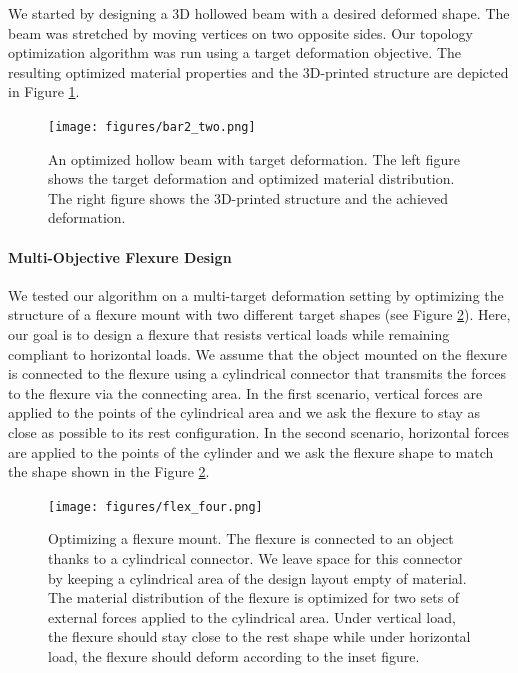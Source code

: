 		We started by designing a 3D hollowed beam with a desired deformed shape. The beam was stretched by moving vertices on two opposite sides. Our topology optimization algorithm was run using a target deformation objective. The resulting optimized material properties and the 3D-printed structure are depicted in Figure \ref{fig:beam}. 
		
		\begin{figure}[h!]
			\centering
			\texttt{[image: figures/bar2\_two.png]}
			\caption{
				An optimized hollow beam with target deformation. The left figure shows the target deformation and optimized material distribution. The right figure shows the 3D-printed structure and the achieved deformation.
				\label{fig:beam}}
		\end{figure}
		
		\paragraph*{Multi-Objective Flexure Design}
		We tested our algorithm on a multi-target deformation setting by optimizing the structure of a flexure mount with two different target shapes (see Figure \ref{fig:flexure}). Here, our goal is to design a flexure that resists vertical loads while remaining compliant to horizontal loads. We assume that the object mounted on the flexure is connected to the flexure using a cylindrical connector that transmits the forces to the flexure via the connecting area. In the first scenario, vertical forces are applied to the points of the cylindrical area and we ask the flexure to stay as close as possible to its rest configuration. In the second scenario, horizontal forces are applied to the points of the cylinder and we ask the flexure shape to match the shape shown in the Figure \ref{fig:flexure}. %
		\begin{figure}
			\centering
			\texttt{[image: figures/flex\_four.png]}	
			\caption{Optimizing a flexure mount. The flexure is connected to an object thanks to a cylindrical connector. We leave space for this connector by keeping a cylindrical area of the design layout empty of material. The material distribution of the flexure is optimized for two sets of external forces applied to the cylindrical area. Under vertical load, the flexure should stay close to the rest shape while under horizontal load, the flexure should deform according to the inset figure. 
				\label{fig:flexure}}
		\end{figure}
		
